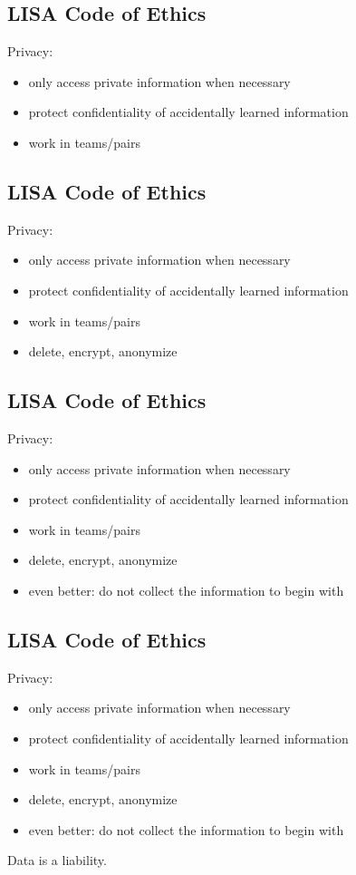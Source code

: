\documentclass[xga]{xdvislides}
\begin{document}
\subsection{LISA Code of Ethics}
Privacy:
\begin{itemize}
	\item only access private information when necessary
	\item protect confidentiality of accidentally learned information
	\item work in teams/pairs
\end{itemize}

\subsection{LISA Code of Ethics}
Privacy:
\begin{itemize}
	\item only access private information when necessary
	\item protect confidentiality of accidentally learned information
	\item work in teams/pairs
	\item delete, encrypt, anonymize
\end{itemize}

\subsection{LISA Code of Ethics}
Privacy:
\begin{itemize}
	\item only access private information when necessary
	\item protect confidentiality of accidentally learned information
	\item work in teams/pairs
	\item delete, encrypt, anonymize
	\item even better: do not collect the information to begin with
\end{itemize}

\subsection{LISA Code of Ethics}
Privacy:
\begin{itemize}
	\item only access private information when necessary
	\item protect confidentiality of accidentally learned information
	\item work in teams/pairs
	\item delete, encrypt, anonymize
	\item even better: do not collect the information to begin with
\end{itemize}
\vspace{.5in}
Data is a liability.
\end{document}
